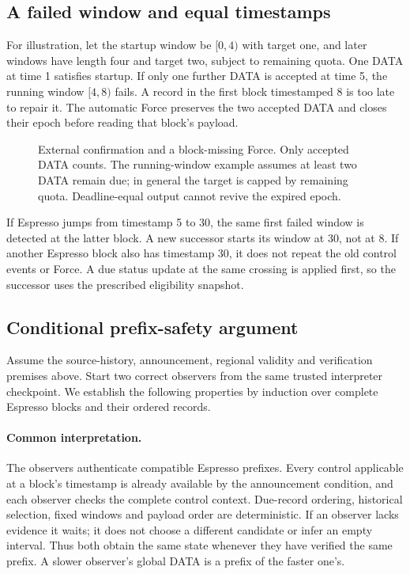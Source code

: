 \documentclass[11pt,a4paper]{article}
\begin{document}
\subsection{A failed window and equal timestamps}
\label{sec:window-example}
For illustration, let the startup window be $[0,4)$ with target one,
and later windows have length four and target two, subject to remaining
quota. One DATA at time 1 satisfies startup. If only one further DATA
is accepted at time 5, the running window $[4,8)$ fails.
A record in the first block timestamped 8 is too late to repair it.
The automatic Force preserves the two accepted DATA and closes their
epoch before reading that block's payload.

\begin{figure}[htbp]\centering

\caption{External confirmation and a block-missing Force. Only accepted
DATA counts. The running-window example assumes at least two DATA
remain due; in general the target is capped by remaining quota.
Deadline-equal output cannot revive the expired epoch.}
\label{fig:observer-finality}
\end{figure}
\FloatBarrier

If Espresso jumps from timestamp 5 to 30, the same first failed window
is detected at the latter block. A new successor starts its window at
30, not at 8. If another Espresso block also has timestamp 30, it does
not repeat the old control events or Force. A due status update at the
same crossing is applied first, so the successor uses the prescribed
eligibility snapshot.

\subsection{Conditional prefix-safety argument}
\label{sec:safety-argument}
Assume the source-history, announcement, regional validity and
verification premises above. Start two correct observers from the same
trusted interpreter checkpoint. We establish the following properties
by induction over complete Espresso blocks and their ordered records.

\paragraph{Common interpretation.}
The observers authenticate compatible Espresso prefixes. Every control
applicable at a block's timestamp is already available by the
announcement condition, and each observer checks the complete control
context. Due-record ordering, historical selection, fixed windows and
payload order are deterministic. If an observer lacks evidence it waits;
it does not choose a different candidate or infer an empty interval.
Thus both obtain the same state whenever they have verified the same
prefix. A slower observer's global DATA is a prefix of the faster one's.
\end{document}

